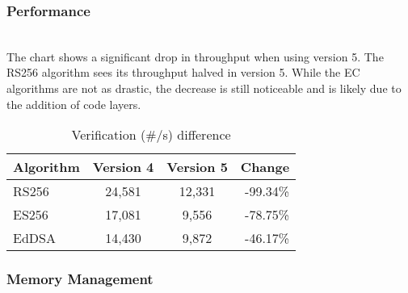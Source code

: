 \subsubsection*{Performance}
 \\
The chart shows a significant drop in throughput when using version 5. The RS256 algorithm sees its throughput halved in version 5. While the EC algorithms are not as drastic, the decrease is still noticeable and is likely due to the addition of code layers. 

\begin{table}[h]
    \centering
    \begin{tabular}{lccr}
        \toprule
        Algorithm & Version 4 & Version 5 & \multicolumn{1}{c}{Change} \\
        \midrule
        RS256 & 24,581 & 12,331 & \textcolor{darkerred}{-99.34\%} \\
        ES256 & 17,081 & 9,556 & \textcolor{darkerred}{-78.75\%} \\
        EdDSA & 14,430 & 9,872 & \textcolor{darkerred}{-46.17\%} \\
        \bottomrule
    \end{tabular}
    \caption{Verification  (\#/s) difference}
\end{table}

\subsubsection*{Memory Management}

